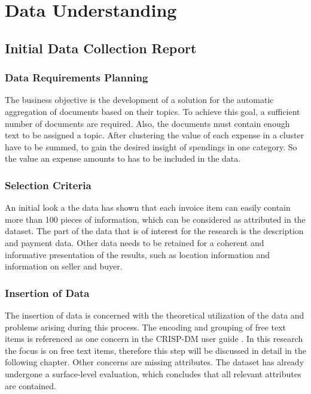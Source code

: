 \chapter{Data Understanding}

\section{Initial Data Collection Report}

\subsection{Data Requirements Planning}
The business objective is the development of a solution for the automatic aggregation of documents based on their topics. To achieve this goal, a sufficient number of documents are required. Also, the documents must contain enough text to be assigned a topic. After clustering the value of each expense in a cluster have to be summed, to gain the desired insight of spendings in one category. So the value an expense amounts to has to be included in the data.

\subsection{Selection Criteria}
An initial look a the data has shown that each invoice item can easily contain more than 100 pieces of information, which can be considered as attributed in the dataset. The part of the data that is of interest for the research is the description and payment data. Other data needs to be retained for a coherent and informative presentation of the results, such as location information and information on seller and buyer.

\subsection{Insertion of Data}

The insertion of data is concerned with the theoretical utilization of the data and problems arising during this process. The encoding and grouping of free text items is referenced as one concern in the \ac{CRISP-DM} user guide \cite[p.~38]{CRISPDM2000}. In this research the focus is on free text items, therefore this step will be discussed in detail in the following chapter. 
Other concerns are missing attributes. The dataset has already undergone a surface-level evaluation, which concludes that all relevant attributes are contained.

